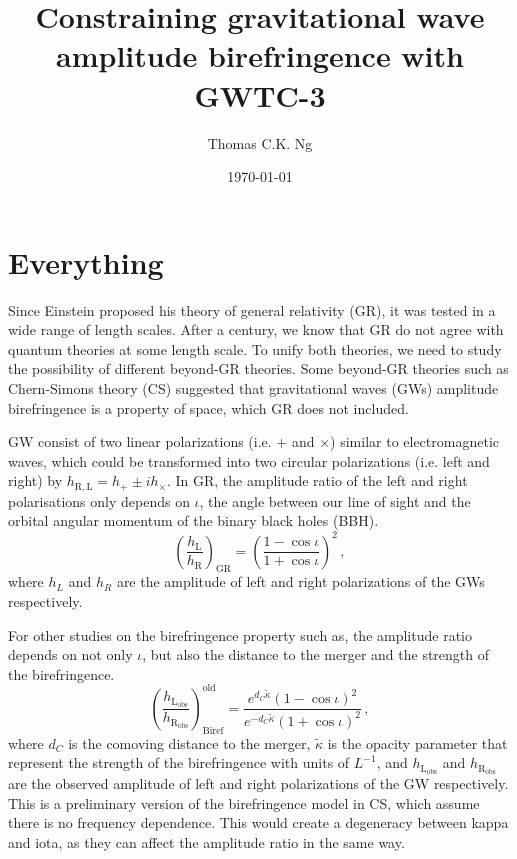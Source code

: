 \documentclass[twocolumn]{aastex631}
\begin{document}
\title{Constraining gravitational wave amplitude birefringence with GWTC-3}

\author{Thomas C.K. Ng}

\date{\today}

\begin{abstract}
    
\end{abstract}

\section{Everything}
Since Einstein proposed his theory of general relativity (GR), it was tested in a wide range of length scales.
After a century, we know that GR do not agree with quantum theories at some length scale.
To unify both theories, we need to study the possibility of different beyond-GR theories.
Some beyond-GR theories such as Chern-Simons theory (CS) suggested that gravitational waves (GWs) amplitude birefringence is a property of space, which GR does not included.

GW consist of two linear polarizations (i.e. $+$ and $\times$) similar to electromagnetic waves, which could be transformed into two circular polarizations (i.e. left and right) by $h_{\mathrm{R}, \mathrm{L}} = h_+ \pm i h_\times$.
In GR, the amplitude ratio of the left and right polarisations only depends on $\iota$, the angle between our line of sight and the orbital angular momentum of the binary black holes (BBH).
\begin{equation}
    \left(\frac{h_\mathrm{L}}{h_\mathrm{R}}\right)_\mathrm{GR}=\left(\frac{1-\cos\iota}{1+\cos\iota}\right)^2\,,
\end{equation}where $h_L$ and $h_R$ are the amplitude of left and right polarizations of the GWs respectively.

For other studies on the birefringence property such as\citet{Maria_2021}, the amplitude ratio depends on not only $\iota$, but also the distance to the merger and the strength of the birefringence.
\begin{equation}
    \left(\frac{h_\mathrm{L_{obs}}}{h_\mathrm{R_{obs}}}\right)_\mathrm{Biref}^\mathrm{old}=\frac{e^{d_C\widetilde{\kappa}}\left(1-\cos\iota\right)^2}{e^{-d_C\widetilde{\kappa}}\left(1+\cos\iota\right)^2}\,,
\end{equation}where $d_C$ is the comoving distance to the merger, $\widetilde{\kappa}$ is the opacity parameter that represent the strength of the birefringence with units of $L^{-1}$, and $h_\mathrm{L_{obs}}$ and $h_\mathrm{R_{obs}}$ are the observed amplitude of left and right polarizations of the GW respectively.
This is a preliminary version of the birefringence model in CS, which assume there is no frequency dependence.
This would create a degeneracy between kappa and iota, as they can affect the amplitude ratio in the same way.
\end{document}

